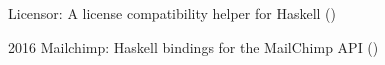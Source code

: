 
{Licensor: A license compatibility helper for Haskell\newline
  ()}

\cvitem
{2016}
{Mailchimp: Haskell bindings for the MailChimp API\newline
  ()}
